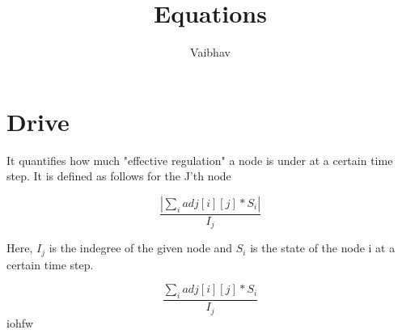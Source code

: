 \documentclass{article}
\title{Equations}
\author{Vaibhav}
\begin{document}
\maketitle

\section{Drive}

It quantifies how much "effective regulation"  a node is under at a certain time step. It is defined as follows for the J'th node 

\[  \frac { | \sum_{ i } ^ { } adj[i][j]*S_i  | } {I_j}                     \]
 
Here, $ I_j $ is the indegree of the given node and $ S_i $ is the state of the node i at a certain time step. 

\[  \frac {  \sum_{ i } ^ { } adj[i][j]*S_i   } {I_j}                     \]
 iohfw
\end{document}
